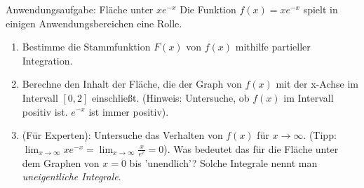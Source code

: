 \begin{aufgabenumgebung}{Anwendungsaufgabe: Fläche unter $xe^{-x}$}
Die Funktion $f(x) = xe^{-x}$ spielt in einigen Anwendungsbereichen eine Rolle.
\begin{enumerate}
    \item Bestimme die Stammfunktion $F(x)$ von $f(x)$ mithilfe partieller Integration.
    \item Berechne den Inhalt der Fläche, die der Graph von $f(x)$ mit der x-Achse im Intervall $[0, 2]$ einschließt. (Hinweis: Untersuche, ob $f(x)$ im Intervall positiv ist. $e^{-x}$ ist immer positiv).
    \item (Für Experten): Untersuche das Verhalten von $f(x)$ für $x \to \infty$. (Tipp: $\lim_{x \to \infty} xe^{-x} = \lim_{x \to \infty} \frac{x}{e^x} = 0$). Was bedeutet das für die Fläche unter dem Graphen von $x=0$ bis 'unendlich'? Solche Integrale nennt man \textit{uneigentliche Integrale}.
\end{enumerate}
\end{aufgabenumgebung}

